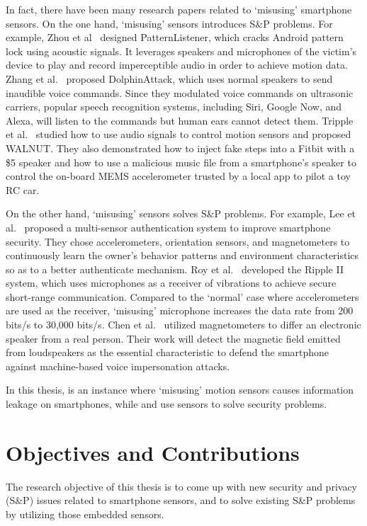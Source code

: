 In fact, there have been many research papers related to `misusing' smartphone sensors. On the one hand, `misusing' sensors introduces S\&P problems. For example, Zhou et al~\cite{zhou2018patternlistener} designed PatternListener, which cracks Android pattern lock using acoustic signals. It leverages speakers and microphones of the victim's device to play and record imperceptible audio in order to achieve motion data.
Zhang et al.~\cite{zhang2017dolphinattack} proposed DolphinAttack, which uses normal speakers to send inaudible voice commands. Since they modulated voice commands on ultrasonic carriers, popular speech recognition systems, including Siri, Google Now, and Alexa, will listen to the commands but human ears cannot detect them. Tripple et al.~\cite{trippel2017walnut} studied how to use audio signals to control motion sensors and proposed WALNUT. They also demonstrated how to inject fake steps into a Fitbit with a \$5 speaker and how to use a malicious music file from a smartphone's speaker to control the on-board MEMS accelerometer trusted by a local app to pilot a toy RC car. 

On the other hand, `misusing' sensors solves S\&P problems. 
For example, Lee et al.~\cite{lee2015multi} proposed a multi-sensor authentication system to improve smartphone security. They chose accelerometers, orientation sensors, and magnetometers to continuously learn the owner's behavior patterns and environment characteristics so as to a better authenticate mechanism. 
Roy et al.~\cite{roy2016ripple} developed the Ripple II system, which uses microphones as a receiver of vibrations to achieve secure short-range communication. Compared to the `normal' case where accelerometers are used as the receiver, `misusing' microphone increases the data rate from  200 bits/s to 30,000 bits/s.  
Chen et al.~\cite{chen2017you} utilized magnetometers to differ an electronic speaker from a real person. Their work will detect the magnetic field emitted from loudspeakers as the essential characteristic to defend the smartphone against machine-based voice impersonation attacks.

In this thesis, {\spp} is an instance where `misusing' motion sensors causes information leakage on smartphones, while {\uu} and {\mv} use sensors to solve security problems. 


\section{Objectives and Contributions}
	The research objective of this thesis is to come up with new security and privacy (S\&P) issues related to smartphone sensors, and to solve existing S\&P problems by utilizing those embedded sensors. 
	
